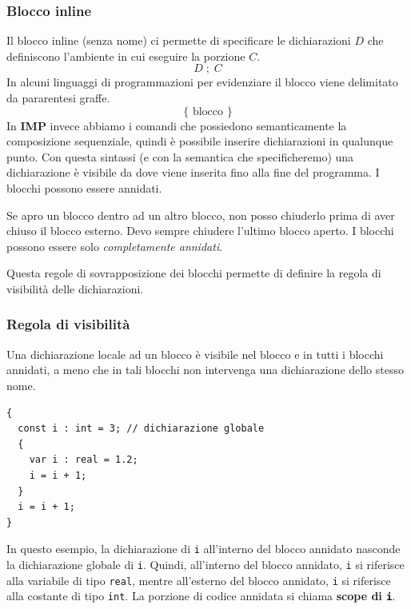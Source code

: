 \documentclass[a4paper]{article}
\begin{document}
\subsubsection{Blocco inline}
Il blocco inline (senza nome) ci permette
di specificare le dichiarazioni $D$ che definiscono 
l'ambiente in cui eseguire la porzione $C$.
\[
  D \; ; \; C 
\]
In alcuni linguaggi di programmazioni per evidenziare il blocco 
viene delimitato da pararentesi graffe.
\[
  \{\text{ blocco }\}
\]
In \textbf{IMP} invece abbiamo i comandi che 
possiedono semanticamente la composizione sequenziale, 
quindi è possibile inserire
dichiarazioni in qualunque punto. Con questa sintassi (e con la semantica che 
specificheremo) una dichiarazione è visibile da dove viene inserita fino alla fine 
del programma. I blocchi possono essere annidati.
\begin{Observation}{}{}
  Se apro un blocco dentro ad un altro blocco, non posso chiuderlo 
prima di aver chiuso il blocco esterno.
  Devo sempre chiudere l'ultimo blocco aperto. 
  I blocchi possono essere solo \textit{completamente annidati}.

  Questa regole di sovrapposizione dei blocchi permette di definire la regola di visibilità 
  delle dichiarazioni.
\end{Observation}
\subsubsection{Regola di visibilità}

Una dichiarazione locale ad un blocco è visibile nel blocco e in tutti 
i blocchi annidati, a meno che in tali blocchi non intervenga una dichiarazione 
dello stesso nome.

\begin{lstlisting}
{
  const i : int = 3; // dichiarazione globale
  {
    var i : real = 1.2; 
    i = i + 1; 
  }
  i = i + 1;
}
\end{lstlisting}
In questo esempio, la dichiarazione di \texttt{i} all'interno del blocco annidato nasconde 
la dichiarazione globale di \texttt{i}. Quindi, all'interno del blocco annidato, \texttt{i} 
si riferisce alla variabile di tipo \texttt{real}, 
mentre all'esterno del blocco annidato, \texttt{i} 
si riferisce alla costante di tipo \texttt{int}. La porzione di codice annidata
si chiama \textbf{scope di \texttt{i}}.
\end{document}
